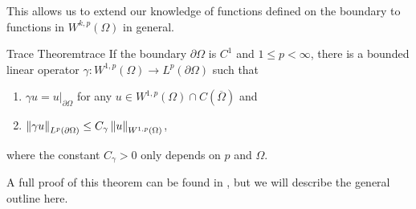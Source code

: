\noindent
This allows us to extend our knowledge of functions defined on the boundary to functions in $W^{k,p}(\Omega)$ in general.

\begin{theorem}{Trace Theorem}{trace}
    If the boundary $\partial \Omega$ is $C^1$ and $1 \leq p < \infty$, there is a bounded linear operator $\gamma: W^{1,p}(\Omega) \to L^p(\partial \Omega)$ such that
    
    \begin{enumerate}[label=(\roman*)]
        \item $\gamma u = u \vert_{\partial \Omega}$ for any $u \in W^{1,p}(\Omega) \cap C(\overline{\Omega})$ and
        \item \label{item:trace_property_2} $\left\| \gamma u \right\|_{L^p(\partial \Omega)} \leq C_\gamma \left\| u \right\|_{W^{1,p}(\Omega)}$,
    \end{enumerate}
    
    where the constant $C_\gamma > 0$ only depends on $p$ and $\Omega$.
\end{theorem}

A full proof of this theorem can be found in \cite{evans2010partial}, but we will describe the general outline here. 

